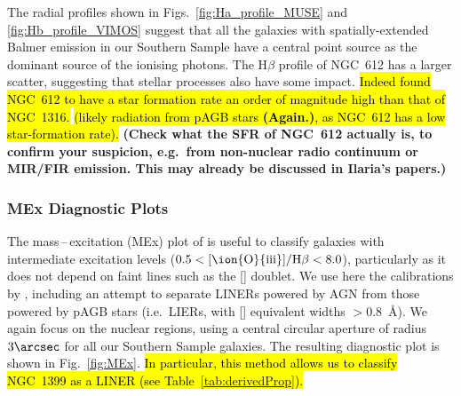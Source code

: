 \documentclass[a4paper,fleqn,usenatbib]{mnras}
\DeclareRobustCommand{\removed}[1]{{\sethlcolor{red}\hl{#1}}}
\DeclareRobustCommand{\added}[1]{{\sethlcolor{green}\hl{#1}}}
\begin{document}
The radial profiles shown in Figs.~\ref{fig:Ha_profile_MUSE} and
\ref{fig:Hb_profile_VIMOS} suggest that all the galaxies with
spatially-extended Balmer emission in our Southern Sample have a
central point source as the dominant source of the ionising
photons. The H$\beta$ profile of NGC~612 has a larger scatter,
suggesting that stellar processes also have some impact. \added{Indeed 
\citet{Asabere2016} found NGC~612 to have a star formation rate an 
order of magnitude high than that of NGC~1316.} \removed{(likely
radiation from pAGB stars {\bf (Again.)}, as NGC~612 has a low
star-formation rate).} {\bf (Check what the SFR of NGC~612 actually is,
  to confirm your suspicion, e.g.\ from non-nuclear radio continuum or
  MIR/FIR emission. This may already be discussed in Ilaria's
  papers.)}

\subsubsection{MEx Diagnostic Plots}
\label{subsubsec:MEx}

The mass\,--\,excitation (MEx) plot of \citet{Juneau2011} is useful to
classify galaxies with intermediate excitation levels
($0.5<\mathrm{[\ion{O}{iii}]/H\beta}<8.0$), particularly as it does
not depend on faint lines such as the [] doublet. We use
here the calibrations by \citet{Nyland2016}, including an attempt to
separate LINERs powered by AGN from those powered by pAGB stars (i.e.\
LIERs, with [] equivalent widths $>0.8$~\AA). We again
focus on the nuclear regions, using a central circular aperture of
radius $3\arcsec$ for all our Southern Sample galaxies. The resulting
diagnostic plot is shown in Fig.~\ref{fig:MEx}. \added{In particular, this 
method allows us to classify NGC~1399 as a LINER (see 
Table~\ref{tab:derivedProp}).}
\end{document}
